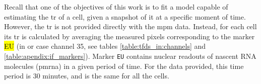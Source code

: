 Recall that one of the objectives of this work is to fit a model capable of estimating the \gls{tr} of a cell, given a snapshot of it at a specific moment of time.
However, the \gls{tr} is not provided directly with the \gls{mpm} data.
Instead, for each cell its \gls{tr} is calculated by averaging the measured pixels corresponding to the marker \hl{EU} (in or case channel 35, see tables \ref{table:tfds_in:channels} and \ref{table:apendix:if_markers}).
Marker \texttt{EU} contains nuclear readouts of nascent RNA molecules (\gls{pmrna}) in a given period of time. For the data provided, this time period is 30 minutes, and is the same for all the cells.
